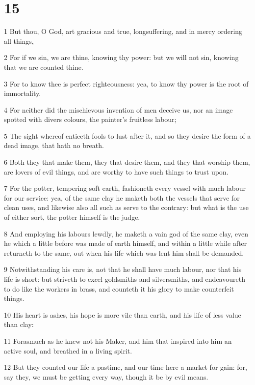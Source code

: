 \chapter{15}

\par 1 But thou, O God, art gracious and true, longsuffering, and in mercy ordering all things,
\par 2 For if we sin, we are thine, knowing thy power: but we will not sin, knowing that we are counted thine.
\par 3 For to know thee is perfect righteousness: yea, to know thy power is the root of immortality.
\par 4 For neither did the mischievous invention of men deceive us, nor an image spotted with divers colours, the painter's fruitless labour;
\par 5 The sight whereof enticeth fools to lust after it, and so they desire the form of a dead image, that hath no breath.
\par 6 Both they that make them, they that desire them, and they that worship them, are lovers of evil things, and are worthy to have such things to trust upon.
\par 7 For the potter, tempering soft earth, fashioneth every vessel with much labour for our service: yea, of the same clay he maketh both the vessels that serve for clean uses, and likewise also all such as serve to the contrary: but what is the use of either sort, the potter himself is the judge.
\par 8 And employing his labours lewdly, he maketh a vain god of the same clay, even he which a little before was made of earth himself, and within a little while after returneth to the same, out when his life which was lent him shall be demanded.
\par 9 Notwithstanding his care is, not that he shall have much labour, nor that his life is short: but striveth to excel goldsmiths and silversmiths, and endeavoureth to do like the workers in brass, and counteth it his glory to make counterfeit things.
\par 10 His heart is ashes, his hope is more vile than earth, and his life of less value than clay:
\par 11 Forasmuch as he knew not his Maker, and him that inspired into him an active soul, and breathed in a living spirit.
\par 12 But they counted our life a pastime, and our time here a market for gain: for, say they, we must be getting every way, though it be by evil means.
